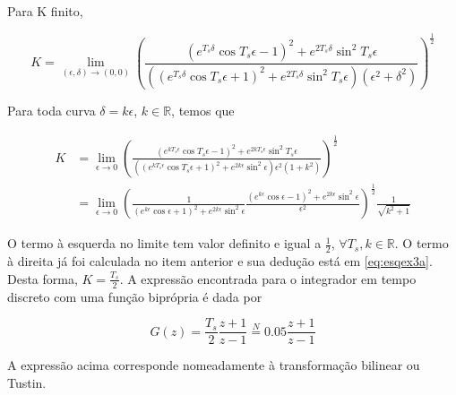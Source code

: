 \begin{enumerate}
        Para K finito, 
        
            \begin{equation}
                K = \lim\limits_{(\epsilon, \delta) \rightarrow (0, 0)} \left( \frac{(e^{T_s \delta} \cos T_s \epsilon - 1)^2 +  e^{2 T_s \delta} \sin^2 T_s \epsilon}{((e^{T_s \delta} \cos T_s \epsilon + 1)^2 +  e^{2 T_s \delta} \sin^2 T_s \epsilon) (\epsilon^2 + \delta^2)} \right)^{\frac{1}{2}}
            \end{equation}
        
        Para toda curva $\delta = k \epsilon$, $k \in \mathbb{R}$, temos que 

        \begin{equation}
            \begin{split}
                K &= \lim\limits_{\epsilon \rightarrow 0} \left( \frac{(e^{k T_s \epsilon} \cos T_s \epsilon - 1)^2 +  e^{2 k T_s \epsilon} \sin^2 T_s \epsilon}{((e^{k T_s \epsilon} \cos T_s \epsilon + 1)^2 +  e^{2 k \epsilon} \sin^2 \epsilon) \epsilon^2 (1 + k^2)} \right)^{\frac{1}{2}} \\
                & = \lim\limits_{\epsilon \rightarrow 0} \left( \frac{1}{(e^{k \epsilon} \cos \epsilon + 1)^2 +  e^{2 k \epsilon} \sin^2 \epsilon} \frac{(e^{k \epsilon} \cos \epsilon - 1)^2 +  e^{2 k \epsilon} \sin^2 \epsilon}{\epsilon^2} \right)^{\frac{1}{2}} \frac{1}{\sqrt{k^2 + 1}}
            \end{split}
        \end{equation}
        
        O termo à esquerda no limite tem valor definito e igual a $\frac{1}{2}$, $\forall T_s, k \in \mathbb{R}$. O termo à direita já foi calculada no item anterior e sua dedução está em \eqref{eq:esqex3a}. Desta forma, $K = \frac{T_s}{2}$. A expressão encontrada para o integrador em tempo discreto com uma função biprópria é dada por 
        
            \begin{equation}
                G(z) = \frac{T_s}{2} \frac{z + 1}{z - 1} \stackrel{N}{=} 0.05 \frac{z + 1}{z - 1}
            \end{equation}
        
        A expressão acima corresponde nomeadamente à transformação bilinear ou Tustin.
        

    \end{enumerate}